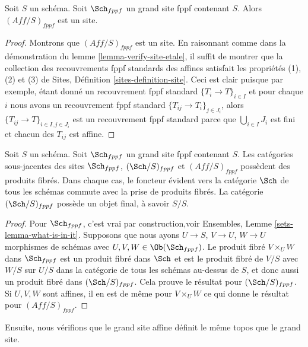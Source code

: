 \begin{lemma}
\label{lemma-verify-site-fppf}
Soit $S$ un schéma. Soit $\Sch_{fppf}$ un grand site fppf contenant $S$. Alors $(\textit{Aff}/S)_{fppf}$ est un site.
\end{lemma}

\begin{proof}
Montrons que $(\textit{Aff}/S)_{fppf}$ est un site. En raisonnant comme dans la démonstration du lemme \ref{lemma-verify-site-etale}, il suffit de montrer que la collection des recouvrements fppf standards des affines satisfait les propriétés (1), (2) et (3) de Sites, Définition \ref{sites-definition-site}. Ceci est clair puisque par exemple, étant donné un recouvrement fppf standard $\{T_i \to T\}_{i\in I}$ et pour chaque $i$ nous avons un recouvrement fppf standard $\{T_{ij} \to T_i\}_{j\in J_i}$, alors $\{T_{ij} \to T\}_{i \in I, j\in J_i}$ est un recouvrement fppf standard parce que $\bigcup_{i\in I} J_i$ est fini et chacun des $T_{ij}$ est affine.
\end{proof}

\begin{lemma}
\label{lemma-fibre-products-fppf}
Soit $S$ un schéma. Soit $\Sch_{fppf}$ un grand site fppf contenant $S$. Les catégories sous-jacentes des sites $\Sch_{fppf}$, $(\Sch/S)_{fppf}$ et $(\textit{Aff}/S)_{fppf}$ possèdent des produits fibrés. Dans chaque cas, le foncteur évident vers la catégorie $\Sch$ de tous les schémas commute avec la prise de produits fibrés. La catégorie $(\Sch/S)_{fppf}$ possède un objet final, à savoir $S/S$.
\end{lemma}

\begin{proof}
Pour $\Sch_{fppf}$, c'est vrai par construction,\newline voir Ensembles, Lemme \ref{sets-lemma-what-is-in-it}. Supposons que nous ayons $U \to S$, $V \to U$, $W \to U$ morphismes de schémas avec $U, V, W \in \Ob(\Sch_{fppf})$. Le produit fibré $V \times_U W$ dans $\Sch_{fppf}$ est un produit fibré dans $\Sch$ et est le produit fibré de $V/S$ avec $W/S$ sur $U/S$ dans la catégorie de tous les schémas au-dessus de $S$, et donc aussi un produit fibré dans $(\Sch/S)_{fppf}$. Cela prouve le résultat pour $(\Sch/S)_{fppf}$. Si $U, V, W$ sont affines, il en est de même pour $V \times_U W$ ce qui donne le résultat pour $(\textit{Aff}/S)_{fppf}$.
\end{proof}

\noindent
Ensuite, nous vérifions que le grand site affine définit le même topos que le grand site.

